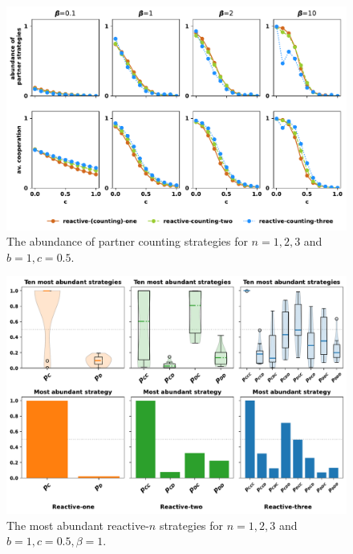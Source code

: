 \documentclass{article}
\theoremstyle{definition}
\begin{document}
\begin{figure}[!htbp]
  \includegraphics[width=\textwidth]{figures/abundance_of_partner_counting_strategies.pdf}
  \caption{The abundance of partner counting strategies for $n=1,2,3$ and $b=1, c=0.5$.}
\end{figure}

\begin{figure}[!htbp]
  \includegraphics[width=\textwidth]{figures/abundant_strategies.pdf}
  \caption{The most abundant reactive-$n$ strategies for $n=1,2,3$ and $b=1, c=0.5, \beta=1$.}
\end{figure}
\end{document}
